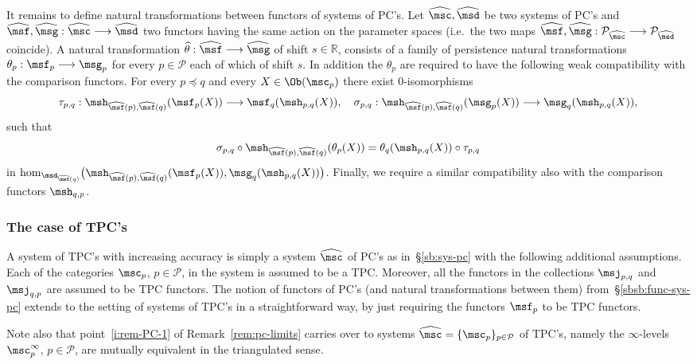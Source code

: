 It remains to define natural transformations between functors of
systems of PC's. Let $\widehat{\msc}, \widehat{\msd}$ be two systems of PC's and
$\widehat{\msf}, \widehat{\msg}: \widehat{\msc} \longrightarrow
\widehat{\msd}$ two functors having the same action on the parameter
spaces (i.e.~the two maps
$\widehat{\msf}, \widehat{\msg}: \mathcal{P}_{\widehat{\msc}}
\longrightarrow \mathcal{P}_{\widehat{\msd}}$ coincide). A natural
transformation
$\widehat{\theta}: \widehat{\msf} \longrightarrow \widehat{\msg}$ of
shift $s \in \mathbb{R}$, consists of a family of persistence natural
transformations $\theta_p : \msf_p \longrightarrow \msg_p$ for every
$p \in \mathcal{P}$ each of which of shift $s$. In addition the
$\theta_p$ are required to have the following weak compatibility with
the comparison functors. For every $p \preceq q$ and every
$X \in \Ob(\msc_p)$ there exist $0$-isomorphisms
$$\tau_{p,q}: \msh_{\widehat{\msf}(p), \widehat{\msf}(q)}(\msf_p (X))
\longrightarrow \msf_q (\msh_{p,q}(X)), \quad \sigma_{p,q}:
\msh_{\widehat{\msf}(p), \widehat{\msf}(q)}(\msg_p(X)) \longrightarrow
\msg_q(\msh_{p,q}(X)),$$ such that
$$\sigma_{p,q} \circ \msh_{\widehat{\msf}(p), \widehat{\msf}(q)}(\theta_p(X)) = 
\theta_q(\msh_{p,q}(X)) \circ \tau_{p,q}$$ in
$\hom_{\msd_{\widehat{\msf}(q)}} \bigl( \msh_{\widehat{\msf}(p),
  \widehat{\msf}(q)}(\msf_p (X)), \msg_q(\msh_{p,q}(X))
\bigr)$. Finally, we require a similar compatibility also with the
comparison functors $\msh_{q,p}$.

\subsubsection{The case of TPC's} \label{sb:sys-tpc} A system of TPC's
with increasing accuracy is simply a system $\widehat{\msc}$ of PC's
as in~\S\ref{sb:sys-pc} with the following additional
assumptions. Each of the categories $\msc_p$, $p \in \mathcal{P}$, in
the system is assumed to be a TPC. Moreover, all the functors in the
collections $\msj_{p,q}$ and $\msj_{q,p}$ are assumed to be TPC
functors. The notion of functors of PC's (and natural transformations
between them) from~\S\ref{sbsb:func-sys-pc} extends to the setting of
systems of TPC's in a straightforward way, by just requiring the
functors ${\msf}_p$ to be TPC functors.

Note also that point~\eqref{i:rem-PC-1} of Remark~\ref{rem:pc-limits}
carries over to systems
$\widehat{\msc} = \{\msc_p\}_{p \in \mathcal{P}}$ of TPC's, namely the
$\infty$-levels $\msc^{\infty}_p$, $p \in \mathcal{P}$, are mutually
equivalent in the triangulated sense.



